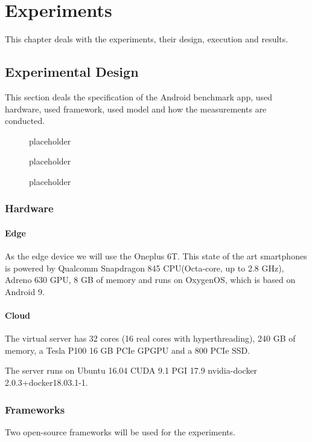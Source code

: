\chapter{Experiments}
\label{chap:experiments}
This chapter deals with the experiments, their design, execution and results.
\section{Experimental Design}
This section deals the specification of the Android benchmark app, used hardware, used framework, used model and how the measurements are conducted. 
\begin{figure}[H]
\centering

\caption{placeholder}
\label{fig:cloud}
\end{figure}
\begin{figure}[H]
\centering

\caption{placeholder}
\label{fig:cloud}
\end{figure}
\begin{figure}[H]
\centering

\caption{placeholder}
\label{fig:edge}
\end{figure}
\subsection{Hardware}
\subsubsection{Edge}
As the edge device we will use the Oneplus 6T. This state of the art smartphones is powered by Qualcomm Snapdragon 845 CPU(Octa-core, up to 2.8 GHz), Adreno 630 GPU, 8 GB of memory and runs on OxygenOS, which is based on Android 9.
\subsubsection{Cloud}
The virtual server has 32 cores (16 real cores with hyperthreading), 240 GB of memory, a Tesla P100 16 GB PCIe GPGPU and a 800 PCIe SSD.

The server runs on Ubuntu 16.04 CUDA 9.1 PGI 17.9 nvidia-docker 2.0.3+docker18.03.1-1.
\subsection{Frameworks}
Two open-source frameworks will be used for the experiments.
